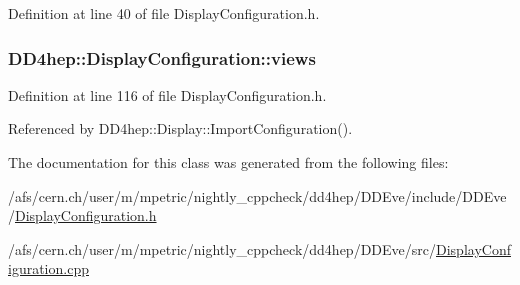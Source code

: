 Definition at line 40 of file DisplayConfiguration.h.\hypertarget{class_d_d4hep_1_1_display_configuration_a630bc25ef7e739a5067c72b6b7996527}{
\subsubsection[{views}]{ {\bf DD4hep::DisplayConfiguration::views}}}
\label{class_d_d4hep_1_1_display_configuration_a630bc25ef7e739a5067c72b6b7996527}


Definition at line 116 of file DisplayConfiguration.h.

Referenced by DD4hep::Display::ImportConfiguration().

The documentation for this class was generated from the following files:\begin{DoxyCompactItemize}
\item 
/afs/cern.ch/user/m/mpetric/nightly\_\-cppcheck/dd4hep/DDEve/include/DDEve/\hyperlink{_display_configuration_8h}{DisplayConfiguration.h}\item 
/afs/cern.ch/user/m/mpetric/nightly\_\-cppcheck/dd4hep/DDEve/src/\hyperlink{_display_configuration_8cpp}{DisplayConfiguration.cpp}\end{DoxyCompactItemize}
